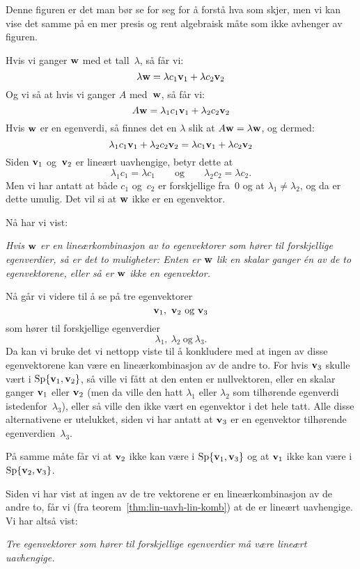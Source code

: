 Denne figuren er det man bør se for seg for å forstå hva som skjer,
men vi kan vise det samme på en mer presis og rent algebraisk måte som
ikke avhenger av figuren.

Hvis vi ganger $\mathbf{w}$ med et tall~$\lambda$, så får vi:
\[
\lambda \mathbf{w} = \lambda c_1 \mathbf{v}_1 + \lambda c_2 \mathbf{v}_2
\]
Og vi så at hvis vi ganger $A$ med~$\mathbf{w}$, så får vi:
\[
A \mathbf{w} = \lambda_1 c_1 \mathbf{v}_1 + \lambda_2 c_2 \mathbf{v}_2
\]
Hvis $\mathbf{w}$ er en egenverdi, så finnes det en $\lambda$ slik at
$A \mathbf{w} = \lambda \mathbf{w}$, og dermed:
\[
\lambda_1 c_1 \mathbf{v}_1 + \lambda_2 c_2 \mathbf{v}_2 = \lambda c_1 \mathbf{v}_1 + \lambda c_2 \mathbf{v}_2
\]
Siden $\mathbf{v}_1$ og~$\mathbf{v}_2$ er lineært uavhengige, betyr dette at
\[
\lambda_1 c_1 = \lambda c_1
\qquad\text{og}\qquad
\lambda_2 c_2 = \lambda c_2.
\]
Men vi har antatt at både $c_1$ og~$c_2$ er forskjellige fra~$0$ og at
$\lambda_1 \ne \lambda_2$, og da er dette umulig.  Det vil si at
$\mathbf{w}$ ikke er en egenvektor.

Nå har vi vist:

\smallskip
\noindent\emph{Hvis $\mathbf{w}$ er en lineærkombinasjon av to egenvektorer som
  hører til forskjellige egenverdier, så er det to muligheter: Enten
  er $\mathbf{w}$ lik en skalar ganger én av de to egenvektorene, eller så
  er $\mathbf{w}$ ikke en egenvektor.}
\smallskip

Nå går vi videre til å se på tre egenvektorer
\[
\mathbf{v}_1,\ \mathbf{v}_2\ \text{og}\ \mathbf{v}_3
\]
som hører til forskjellige egenverdier
\[
\lambda_1,\ \lambda_2\ \text{og}\ \lambda_3.
\]
Da kan vi bruke det vi nettopp viste til å konkludere med at ingen av
disse egenvektorene kan være en lineærkombinasjon av de andre to.  For
hvis $\mathbf{v}_3$ skulle vært i $\operatorname{Sp} \{ \mathbf{v}_1, \mathbf{v}_2 \}$, så ville vi
fått at den enten er nullvektoren, eller en skalar ganger $\mathbf{v}_1$
eller $\mathbf{v}_2$ (men da ville den hatt $\lambda_1$ eller $\lambda_2$
som tilhørende egenverdi istedenfor~$\lambda_3$), eller så ville den
ikke vært en egenvektor i det hele tatt.  Alle disse alternativene er
utelukket, siden vi har antatt at $\mathbf{v}_3$ er en egenvektor
tilhørende egenverdien~$\lambda_3$.

På samme måte får vi at $\mathbf{v}_2$ ikke kan være i
$\operatorname{Sp} \{ \mathbf{v}_1, \mathbf{v}_3 \}$ og at $\mathbf{v}_1$ ikke kan være i
$\operatorname{Sp} \{ \mathbf{v}_2, \mathbf{v}_3 \}$.

Siden vi har vist at ingen av de tre vektorene er en lineærkombinasjon
av de andre to, får vi (fra teorem~\ref{thm:lin-uavh-lin-komb}) at de
er lineært uavhengige.  Vi har altså vist:

\smallskip
\noindent\emph{Tre egenvektorer som hører til forskjellige egenverdier
  må være lineært uavhengige.}
\smallskip

